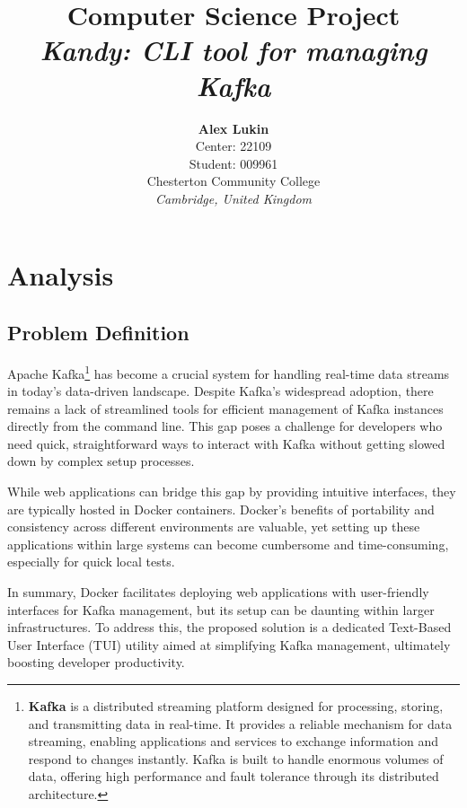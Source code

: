 \documentclass[10pt , a4paper]{report}
\begin{document}
\title{Computer Science Project\\
        \textit{Kandy: CLI tool for managing Kafka}}

\author{\textbf{Alex Lukin}\\
Center: 22109\\
Student: 009961\\
Chesterton Community College\\
\textit{Cambridge, United Kingdom}\\}


\maketitle

\newpage
\tableofcontents
\newpage

\chapter{Analysis}
\section{Problem Definition}

Apache Kafka\footnote{\textbf{Kafka} is a distributed streaming platform designed for processing, storing, and transmitting data in real-time. It provides a reliable mechanism for data streaming, enabling applications and services to exchange information and respond to changes instantly. Kafka is built to handle enormous volumes of data, offering high performance and fault tolerance through its distributed architecture.} has become a crucial system for handling real-time data streams in today’s data-driven landscape. Despite Kafka’s widespread adoption, there remains a lack of streamlined tools for efficient management of Kafka instances directly from the command line. This gap poses a challenge for developers who need quick, straightforward ways to interact with Kafka without getting slowed down by complex setup processes.

While web applications can bridge this gap by providing intuitive interfaces, they are typically hosted in Docker containers. Docker’s benefits of portability and consistency across different environments are valuable, yet setting up these applications within large systems can become cumbersome and time-consuming, especially for quick local tests.

In summary, Docker facilitates deploying web applications with user-friendly interfaces for Kafka management, but its setup can be daunting within larger infrastructures. To address this, the proposed solution is a dedicated Text-Based User Interface (TUI) utility aimed at simplifying Kafka management, ultimately boosting developer productivity.
\end{document}
